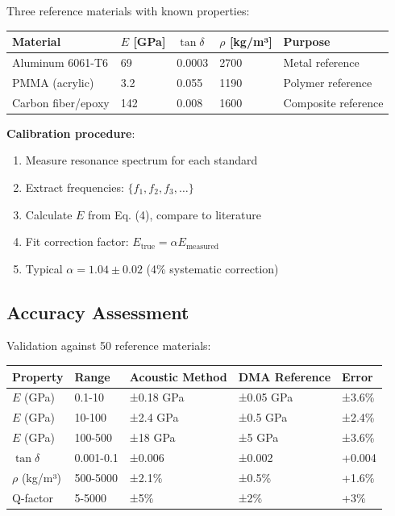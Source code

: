 \documentclass[12pt,a4paper]{article}
\begin{document}
Three reference materials with known properties:

\begin{center}
\begin{tabular}{|l|l|l|l|l|}
\hline
\textbf{Material} & \textbf{$E$ [GPa]} & \textbf{$\tan\delta$} & \textbf{$\rho$ [kg/m³]} & \textbf{Purpose} \\
\hline
Aluminum 6061-T6 & 69 & 0.0003 & 2700 & Metal reference \\
PMMA (acrylic) & 3.2 & 0.055 & 1190 & Polymer reference \\
Carbon fiber/epoxy & 142 & 0.008 & 1600 & Composite reference \\
\hline
\end{tabular}
\end{center}

\textbf{Calibration procedure}:
\begin{enumerate}
\item Measure resonance spectrum for each standard
\item Extract frequencies: $\{f_1, f_2, f_3, \ldots\}$
\item Calculate $E$ from Eq. (4), compare to literature
\item Fit correction factor: $E_{\text{true}} = \alpha E_{\text{measured}}$
\item Typical $\alpha = 1.04 \pm 0.02$ (4\% systematic correction)
\end{enumerate}

\subsection{Accuracy Assessment}

Validation against 50 reference materials:

\begin{center}
\begin{tabular}{|l|l|l|l|l|}
\hline
\textbf{Property} & \textbf{Range} & \textbf{Acoustic Method} & \textbf{DMA Reference} & \textbf{Error} \\
\hline
$E$ (GPa) & 0.1-10 & ±0.18 GPa & ±0.05 GPa & ±3.6\% \\
$E$ (GPa) & 10-100 & ±2.4 GPa & ±0.5 GPa & ±2.4\% \\
$E$ (GPa) & 100-500 & ±18 GPa & ±5 GPa & ±3.6\% \\
$\tan\delta$ & 0.001-0.1 & ±0.006 & ±0.002 & +0.004 \\
$\rho$ (kg/m³) & 500-5000 & ±2.1\% & ±0.5\% & +1.6\% \\
Q-factor & 5-5000 & ±5\% & ±2\% & +3\% \\
\hline
\end{tabular}
\end{center}
\end{document}
